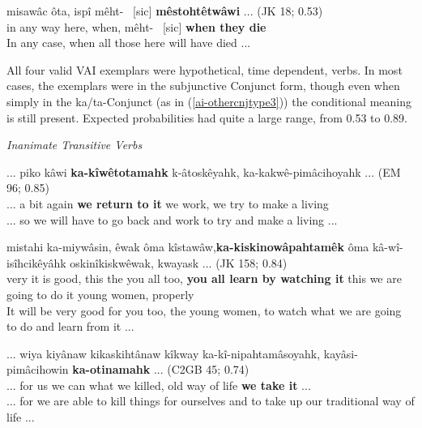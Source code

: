    \begin{exe}
    \ex
    \gll misawâc ôta, ispî mêht-~ [sic] \textbf{mêstohtêtwâwi} ... \tiny{(JK 18; 0.53)} \\
    {in any way} here, when, mêht-~ [sic] {\textbf{when they die}} \\
    \trans In any case, when all those here will have died ... \tiny{\citep[64-65]{KaNipitehtew1998}}
    \label{ai-othercnjtype4}
    \end{exe}
    
All four valid VAI exemplars were hypothetical, time dependent, verbs. In most cases, the exemplars were in the subjunctive Conjunct form, though even when simply in the ka/ta-Conjunct (as in (\ref{ai-othercnjtype3})) the conditional meaning is still present. Expected probabilities had quite a large range, from 0.53 to 0.89.



\vspace{5mm}
\textit{Inanimate Transitive Verbs}

    \begin{exe}
    \ex
    \gll ... piko kâwi \textbf{ka-kîwêtotamahk} k-âtoskêyahk, ka-kakwê-pimâcihoyahk ... \tiny{(EM 96; 0.85)} \\
    ... {a bit} {again} {\textbf{we return to it}} {we work}, {we try to make a living}  \\
    \trans ... so we will have to go back and work to try and make a living ... \tiny{\citep[72-73]{Minde1997kwayask}}
    \label{ti-othercnjtype2}
    \end{exe}
    
    \begin{exe}
    \ex
    \gll mistahi ka-miywâsin, êwak ôma kîstawâw,\textbf{ka-kiskinowâpahtamêk} ôma kâ-wî-isîhcikêyâhk  oskinîkiskwêwak, kwayask ... \tiny{(JK 158; 0.84)} \\
    very {it is good}, this the {you all too}, {\textbf{you all learn by watching it}} {this} {we are going to do it} {young women}, {properly}\\
    \trans It will be very good for you too, the young women, to watch what we are going to do and learn from it ... \tiny{\citep[130-131]{KaNipitehtew1998}}
    \label{ti-othercnjtype2}
    \end{exe}
    
    \begin{exe}
    \ex
    \gll ... wiya kiyânaw kikaskihtânaw kîkway ka-kî-nipahtamâsoyahk, kayâsi-pimâcihowin \textbf{ka-otinamahk} ... \tiny{(C2GB 45; 0.74)} \\
    ... for {us} {we can} what {we killed}, {old way of life} {\textbf{we take it}} ...\\
    \trans ... for we are able to kill things for ourselves and to take up our traditional way of life ... \tiny{\citep[82-83]{Bearetal1992}}
    \label{ti-othercnjtype3}
    \end{exe}
    
